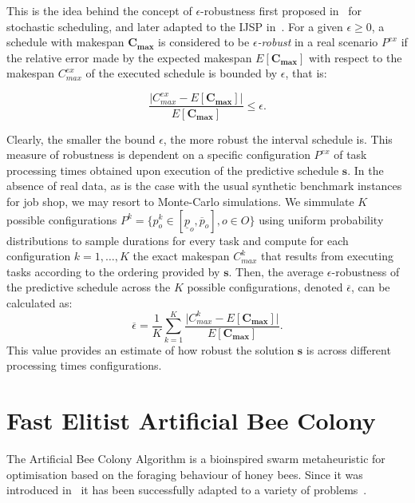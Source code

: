 \documentclass[sn-mathphys]{sn-jnl}%
\theoremstyle{thmstyleone}%
\theoremstyle{thmstyletwo}%
\theoremstyle{thmstylethree}%
\begin{document}
This is the idea behind the concept of $\epsilon$-robustness first proposed in~\cite{Bidot2009} for stochastic scheduling, and later adapted to the IJSP in~\cite{Diaz2020genetic}. For a given $\epsilon \geq 0$, a schedule with makespan $\mathbf{C_{max}}$ is considered to be \emph{$\epsilon$-robust} in a real scenario $P^{ex}$ if the relative error made by the expected makespan $E[\mathbf{C_{max}}]$ with respect to the makespan $C_{max}^{ex}$ of the executed schedule is bounded by $\epsilon$, that is:

\begin{equation}\label{eqEpsilonRobustness2}
\frac{\lvert C_{max}^{ex}-E[\mathbf{C_{max}}]\rvert }{E[\mathbf{C_{max}}]} \leq \epsilon.
\end{equation}

Clearly, the smaller the bound $\epsilon$, the more robust the interval schedule is.
This measure of robustness is dependent on a specific configuration $P^{ex}$ of task processing times obtained upon execution of the predictive schedule $\boldsymbol{s}$. In the absence of real data, as is the case with the usual synthetic benchmark instances for job shop, we may resort to Monte-Carlo simulations. We simmulate $K$ possible configurations $P^k = \{p_o^{k} \in [\underline{p}_o, \overline{p}_o], o \in O\}$ using uniform probability distributions to sample durations for every task and compute for each configuration $k=1,\dots,K$ the exact makespan $C_{max}^k$ that results from executing tasks according to the ordering provided by $\boldsymbol{s}$. Then, the average $\epsilon$-robustness of the predictive schedule across the $K$ possible configurations, denoted $\overline{\epsilon}$, can be calculated as:
\begin{equation}\label{eqMRE}
\overline{\epsilon}=\frac{1}{K}\sum_{k=1}^K \frac{\lvert C_{max}^k-E[\mathbf{C_{max}}]\rvert}{E[\mathbf{C_{max}}]}.
\end{equation}
This value provides an estimate of how robust the solution $\boldsymbol{s}$ is across different processing times configurations.



\section{Fast Elitist Artificial Bee Colony}\label{secABC}

The Artificial Bee Colony Algorithm is a bioinspired swarm metaheuristic for optimisation based on the foraging behaviour of honey bees. Since it was introduced in~\cite{Karaboga2005} it has been successfully adapted to a variety of problems~\cite{Karaboga2014}.
\end{document}
